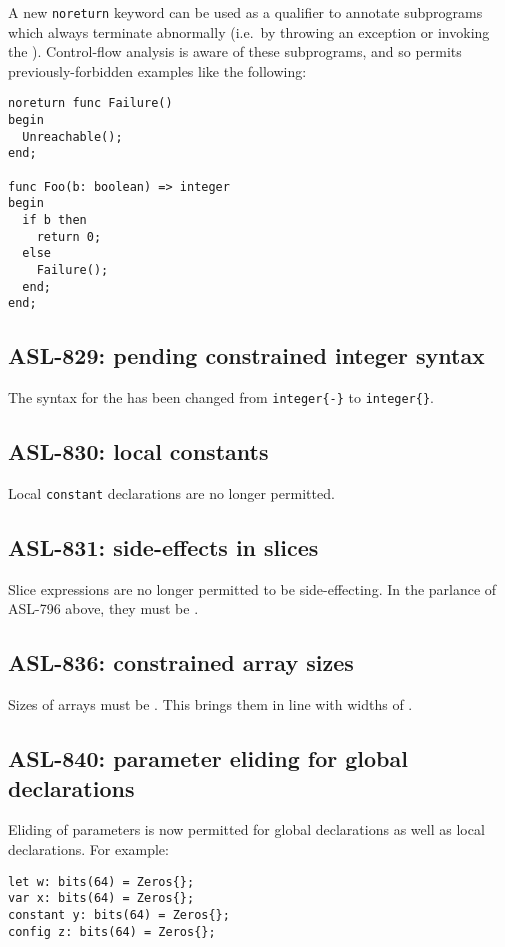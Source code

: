 A new \texttt{noreturn} keyword can be used as a qualifier to annotate subprograms which always terminate abnormally (i.e.\ by throwing an exception or invoking the \unreachablestatementterm).
Control-flow analysis is aware of these subprograms, and so permits previously-forbidden examples like the following:
\begin{lstlisting}
noreturn func Failure()
begin
  Unreachable();
end;

func Foo(b: boolean) => integer
begin
  if b then
    return 0;
  else
    Failure();
  end;
end;
\end{lstlisting}

\subsection{ASL-829: pending constrained integer syntax}

The syntax for the \pendingconstrainedintegertype{} has been changed from \texttt{integer\{-\}}  to \texttt{integer\{\}}.

\subsection{ASL-830: local constants}

Local \texttt{constant} declarations are no longer permitted.

\subsection{ASL-831: side-effects in slices}

Slice expressions are no longer permitted to be side-effecting.
In the parlance of ASL-796 above, they must be \readonly{}.

\subsection{ASL-836: constrained array sizes}

Sizes of arrays must be \constrainedintegers{}.
This brings them in line with widths of \bitvectortypesterm{}.

\subsection{ASL-840: parameter eliding for global declarations}

Eliding of parameters is now permitted for global declarations as well as local declarations.
For example:
\begin{lstlisting}
let w: bits(64) = Zeros{};
var x: bits(64) = Zeros{};
constant y: bits(64) = Zeros{};
config z: bits(64) = Zeros{};
\end{lstlisting}


